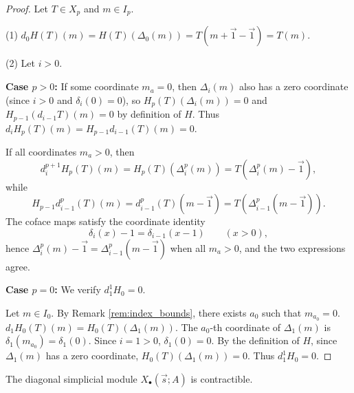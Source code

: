 \begin{proof}
Let $T \in X_p$ and $m \in I_p$.

(1) $d_0 H(T)(m) = H(T)(\Delta_0(m)) = T(m+\vec{1}-\vec{1}) = T(m)$.

(2) Let $i>0$.


\textbf{Case $p>0$:}
If some coordinate $m_a=0$, then $\Delta_i(m)$ also has a zero coordinate (since $i>0$ and $\delta_i(0)=0$), 
so $H_p(T)(\Delta_i(m))=0$ and $H_{p-1}(d_{i-1}T)(m)=0$ by definition of $H$. 
Thus $d_i H_p(T)(m)=H_{p-1} d_{i-1}(T)(m)=0$.

If all coordinates $m_a>0$, then
\[
d_i^{p+1} H_p(T)(m) = H_p(T)(\Delta_i^p(m)) = T(\Delta_i^p(m)-\vec{1}),
\]
while
\[
H_{p-1} d_{i-1}^p(T)(m) = d_{i-1}^p(T)(m-\vec{1})
                         = T(\Delta_{i-1}^p(m-\vec{1})).
\]
The coface maps satisfy the coordinate identity
\[
\delta_i(x)-1 = \delta_{i-1}(x-1)\qquad(x>0),
\]
hence $\Delta_i^p(m)-\vec{1} = \Delta_{i-1}^p(m-\vec{1})$ when all $m_a>0$,
and the two expressions agree.


\textbf{Case $p=0$:} We verify $d_1^1 H_0 = 0$.

Let $m \in I_0$. By Remark \ref{rem:index_bounds}, there exists $a_0$ such that $m_{a_0}=0$.
$d_1 H_0(T)(m) = H_0(T)(\Delta_1(m))$.
The $a_0$-th coordinate of $\Delta_1(m)$ is $\delta_1(m_{a_0}) = \delta_1(0)$. Since $i=1>0$, $\delta_1(0)=0$.
By the definition of $H$, since $\Delta_1(m)$ has a zero coordinate, $H_0(T)(\Delta_1(m))=0$.
Thus $d_1^1 H_0 = 0$.
\end{proof}

\begin{theorem}\label{thm:contractible}
The diagonal simplicial module $X_\bullet(\vec s; A)$ is contractible.
\end{theorem}

